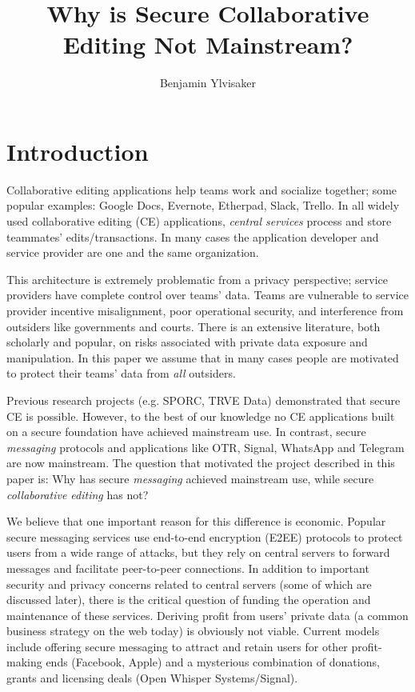 \documentclass{article}
\begin{document}
\title{Why is Secure Collaborative Editing Not Mainstream?}
\author{Benjamin Ylvisaker}

\maketitle

\section{Introduction}

Collaborative editing applications help teams work and socialize together; some popular examples: Google Docs, Evernote, Etherpad, Slack, Trello.
In all widely used collaborative editing (CE) applications, \emph{central services} process and store teammates' edits/transactions.
In many cases the application developer and service provider are one and the same organization.

This architecture is extremely problematic from a privacy perspective; service providers have complete control over teams' data.
Teams are vulnerable to service provider incentive misalignment, poor operational security, and interference from outsiders like governments and courts.
There is an extensive literature, both scholarly and popular, on risks associated with private data exposure and manipulation.
In this paper we assume that in many cases people are motivated to protect their teams' data from \emph{all} outsiders.

Previous research projects (e.g. SPORC\cite{TODO}, TRVE Data\cite{TODO}) demonstrated that secure CE is possible.
However, to the best of our knowledge no CE applications built on a secure foundation have achieved mainstream use.
In contrast, secure \emph{messaging} protocols and applications like OTR, Signal, WhatsApp and Telegram \cite{TODO} are now mainstream.
The question that motivated the project described in this paper is: Why has secure \emph{messaging} achieved mainstream use, while secure \emph{collaborative editing} has not?\footnotemark{}


We believe that one important reason for this difference is economic.
Popular secure messaging services use end-to-end encryption (E2EE) protocols to protect users from a wide range of attacks, but they rely on central servers to forward messages and facilitate peer-to-peer connections.
In addition to important security and privacy concerns related to central servers (some of which are discussed later), there is the critical question of funding the operation and maintenance of these services.
Deriving profit from users' private data (a common business strategy on the web today) is obviously not viable.
Current models include offering secure messaging to attract and retain users for other profit-making ends (Facebook, Apple) and a mysterious combination of donations, grants and licensing deals (Open Whisper Systems/Signal).
\end{document}
